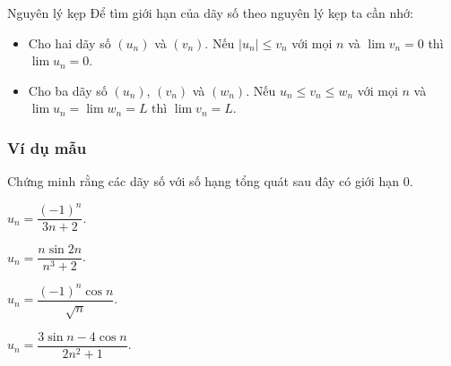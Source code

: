 
\begin{dang}{Nguyên lý kẹp}
		Để tìm giới hạn của dãy số theo nguyên lý kẹp ta cần nhớ:
	\begin{itemize}
		\item Cho hai dãy số $(u_n)$ và $(v_n)$. Nếu $|u_n| \leq v_n$ với mọi $n$ và $\lim v_n = 0$ thì $\lim u_n =0$.
		\item Cho ba dãy số $(u_n)$, $(v_n)$ và $(w_n)$. Nếu $ u_n \leq v_n \leq w_n$ với mọi $n$ và $\lim u_n = \lim w_n = L$ thì $\lim v_n = L$.
	\end{itemize}
\end{dang}
\subsubsection{Ví dụ mẫu}
\begin{vd}%
	Chứng minh rằng các dãy số với số hạng tổng quát sau đây có giới hạn $0$.
	\begin{enumEX}[a)]{2}
		\item $u_n=\dfrac{(-1)^n}{3n+2}$.
		\item $u_n=\dfrac{n\sin 2n}{n^3+2}$.
		\item $u_n=\dfrac{(-1)^n\cos n}{\sqrt{n}}$.
		\item $u_n=\dfrac{3\sin n-4\cos n}{2n^2+1}$.
	\end{enumEX}
\end{vd}
